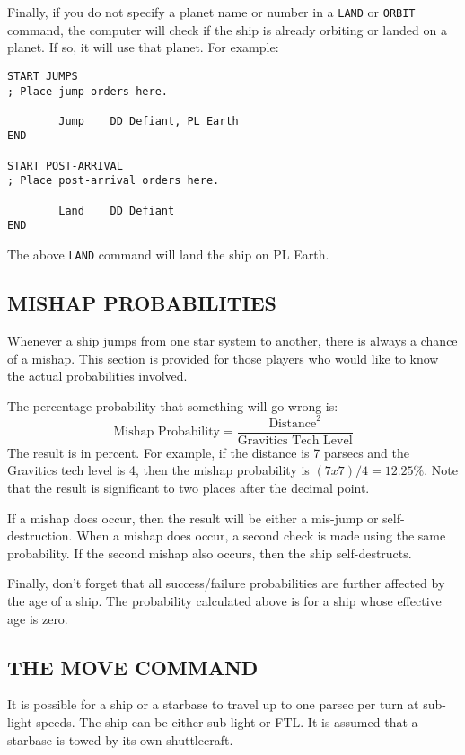 \documentclass[10pt,titlepage]{article}
\begin{document}
Finally, if you do not specify a planet name or number in a \texttt{LAND} or \texttt{ORBIT}
command, the computer will check if the ship is already orbiting or landed
on a planet.  If so, it will use that planet.  For example:

\begin{verbatim}
START JUMPS
; Place jump orders here.

        Jump    DD Defiant, PL Earth
END

START POST-ARRIVAL
; Place post-arrival orders here.

        Land    DD Defiant
END
\end{verbatim} 

The above \texttt{LAND} command will land the ship on PL Earth.


\subsection{MISHAP PROBABILITIES}
\label{sec:mishapprobabilities}


Whenever a ship jumps from one star system to another, there is always a chance
of a mishap.  This section is provided for those players who would like to know
the actual probabilities involved.

The percentage probability that something will go wrong is:
\[
	\textrm{Mishap Probability}  =  \dfrac{\textrm{Distance}^2}{\textrm{Gravitics Tech Level}}
\]
The result is in percent.  For example, if the distance is 7 parsecs and the
Gravitics tech level is 4, then the mishap probability is $(7 x 7)/4 = 12.25\%$.
Note that the result is significant to two places after the decimal point.

If a mishap does occur, then the result will be either a mis-jump or self-
destruction.  When a mishap does occur, a second check is made using the same
probability.  If the second mishap also occurs, then the ship self-destructs.

Finally, don't forget that all success/failure probabilities are further
affected by the age of a ship.  The probability calculated above is for a ship
whose effective age is zero.


\subsection{THE MOVE COMMAND}
\label{sec:movecommand}


It is possible for a ship or a starbase to travel up to one parsec per turn at
sub-light speeds.  The ship can be either sub-light or FTL.  It is assumed that
a starbase is towed by its own shuttlecraft.
\end{document}
